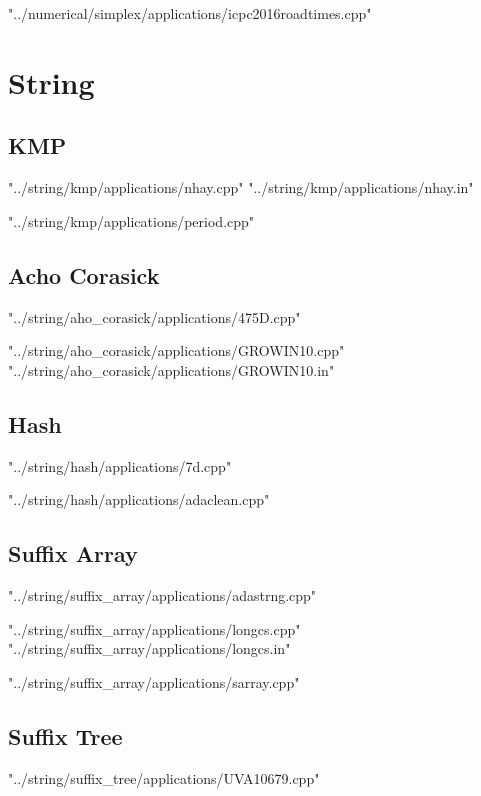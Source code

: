 \documentclass [12pt,onecolumn,oneside]{article}
\begin{document}
 {"../numerical/simplex/applications/icpc2016roadtimes.cpp"}
\newpage

\section{String}
\subsection{ KMP}
 {"../string/kmp/applications/nhay.cpp"}
 {"../string/kmp/applications/nhay.in"}
\newpage

 {"../string/kmp/applications/period.cpp"}
\newpage

\subsection{ Acho Corasick}
 {"../string/aho_corasick/applications/475D.cpp"}
\newpage

 {"../string/aho_corasick/applications/GROWIN10.cpp"}
 {"../string/aho_corasick/applications/GROWIN10.in"}
\newpage

\subsection{ Hash}
 {"../string/hash/applications/7d.cpp"}
\newpage

 {"../string/hash/applications/adaclean.cpp"}
\newpage

\subsection{ Suffix Array}
 {"../string/suffix_array/applications/adastrng.cpp"}
\newpage

 {"../string/suffix_array/applications/longcs.cpp"}
 {"../string/suffix_array/applications/longcs.in"}
\newpage

 {"../string/suffix_array/applications/sarray.cpp"}
\newpage

\subsection{ Suffix Tree}
 {"../string/suffix_tree/applications/UVA10679.cpp"}
\newpage
\end{document}
